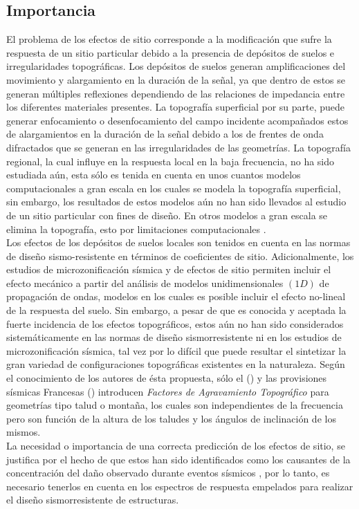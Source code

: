 \documentclass[spanish,letterpaper,12pt,twoside,openany]{article}
\begin{document}
\subsection{Importancia}
%
El problema de los efectos de sitio corresponde a la modificación que sufre la respuesta de un sitio particular debido a la presencia de depósitos de suelos e irregularidades topográficas. Los depósitos de suelos generan amplificaciones del movimiento y alargamiento en la duración de la señal, ya que dentro de estos se generan múltiples reflexiones dependiendo de las relaciones de impedancia entre los diferentes materiales presentes. La topografía superficial por su parte, puede generar enfocamiento o desenfocamiento del campo incidente acompañados estos de alargamientos en la duración de la señal debido a los de frentes de onda difractados que se generan en las irregularidades de las geometrías. La topografía regional, la cual influye en la respuesta local en la baja frecuencia, no ha sido estudiada aún, esta sólo es tenida en cuenta en unos cuantos modelos computacionales a gran escala \citep{Doriam2014, Lee2009a, Lee2009b} en los cuales se modela la topografía superficial, sin embargo, los resultados de estos modelos aún no han sido llevados al estudio de un sitio particular con fines de diseño. En otros modelos a gran escala se elimina la topografía, esto por limitaciones computacionales \citep{Graves2011}.\\
%
Los efectos de los depósitos de suelos locales son tenidos en cuenta en las normas de diseño sismo-resistente \citep[por ejemplo][Sección A.2.4]{NSR-10} en términos de coeficientes de sitio. Adicionalmente, los estudios de microzonificación sísmica y de efectos de sitio permiten incluir el efecto mecánico a partir del análisis de modelos unidimensionales $\left( 1D \right)$ de propagación de ondas, modelos en los cuales es posible incluir el efecto no-lineal de la respuesta del suelo. Sin embargo, a pesar de que es conocida y aceptada la fuerte incidencia de los efectos topográficos, estos aún no han sido considerados sistemáticamente en las normas de diseño sismorresistente ni en los estudios de microzonificación sísmica, tal vez por lo difícil que puede resultar el sintetizar la gran variedad de configuraciones topográficas existentes en la naturaleza. Según el conocimiento de los autores de ésta propuesta, sólo el \citeauthor{EC8} (\citeyear{EC8}) y las provisiones sísmicas Francesas \citeauthor{AFPS1995} (\citeyear{AFPS1995}) introducen \textit{Factores de Agravamiento Topográfico} para geometrías tipo talud o montaña, los cuales son independientes de la frecuencia pero son función de la altura de los taludes y los ángulos de inclinación de los mismos.\\
%
La necesidad o importancia de una correcta predicción de los efectos de sitio, se justifica por el hecho de que estos han sido identificados como los causantes de la concentración del daño observado durante eventos sísmicos \citep[por ejemplo en][entre otros]{Assimaki2013, Hough2011}, por lo tanto, es necesario tenerlos en cuenta en los espectros de respuesta empelados para realizar el diseño sismorresistente de estructuras.
%
%
%
%
%
\end{document}
